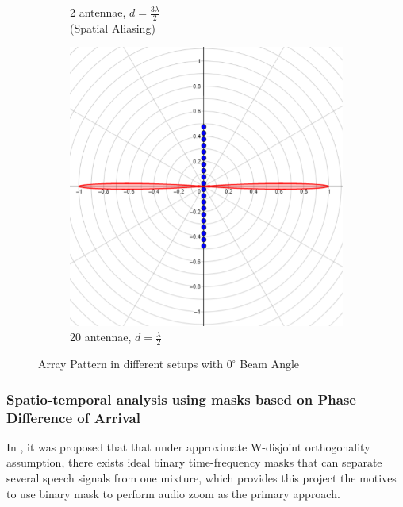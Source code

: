 \documentclass[a4paper,twoside,12pt,hidelinks]{article}
\begin{document}
\begin{figure}[H]
\begin{subfigure}[H]{0.3\textwidth}
\caption{2 antennae, $d =\frac{3\lambda}{2}$ \\(Spatial Aliasing)}
\end{subfigure}
\begin{subfigure}[H]{0.3\textwidth}
\includegraphics[width=\textwidth]{beamforminglargeN}
\caption{20 antennae, $d =\frac{\lambda}{2}$}
\end{subfigure}
\caption{Array Pattern in different setups with $0^\circ$ Beam Angle}
\label{fig:beamforming}
\end{figure}

\subsubsection{Spatio-temporal analysis using masks based on Phase Difference of Arrival}
\label{section:mask}
In \cite{Yilmaz2004BlindMasking}, it was proposed that that under approximate W-disjoint orthogonality assumption, there exists ideal binary time-frequency masks that can separate several speech signals from one mixture, which provides this project the motives to use binary mask to perform audio zoom as the primary approach.
\end{document}
